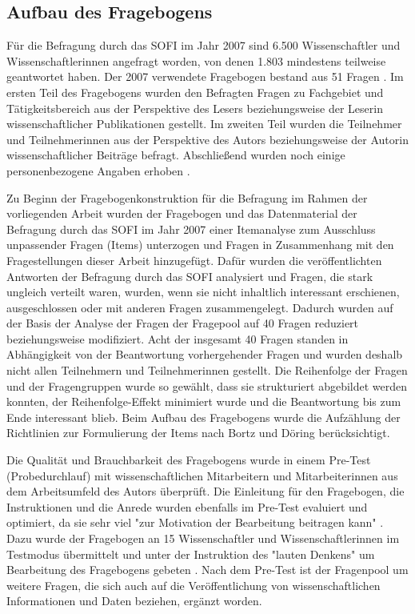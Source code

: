 \subsection{Aufbau des Fragebogens}

Für die Befragung durch das SOFI im Jahr 2007 sind 6.500 Wissenschaftler und Wissenschaftlerinnen angefragt worden, von denen 1.803 mindestens teilweise geantwortet haben. Der 2007 verwendete Fragebogen bestand aus 51 Fragen \cite{Hanekop_Wittke_2007_Fragebogen}. Im ersten Teil des Fragebogens wurden den Befragten Fragen zu Fachgebiet und Tätigkeitsbereich aus der Perspektive des Lesers beziehungsweise der Leserin wissenschaftlicher Publikationen gestellt. Im zweiten Teil wurden die Teilnehmer und Teilnehmerinnen aus der Perspektive des Autors beziehungsweise der Autorin wissenschaftlicher Beiträge befragt. Abschließend wurden noch einige personenbezogene Angaben erhoben \cite{Hanekop_Wittke_2007_Fragebogen}.

Zu Beginn der Fragebogenkonstruktion für die Befragung im Rahmen der vorliegenden Arbeit wurden der Fragebogen und das Datenmaterial der Befragung durch das SOFI im Jahr 2007 einer Itemanalyse zum Ausschluss unpassender Fragen (Items) unterzogen und Fragen in Zusammenhang mit den Fragestellungen dieser Arbeit hinzugefügt. Dafür wurden die veröffentlichten Antworten der Befragung durch das SOFI analysiert \cite{Hanekop_Wittke_2007_Fragebogen} und Fragen, die stark ungleich verteilt waren, wurden, wenn sie nicht inhaltlich interessant erschienen, ausgeschlossen oder mit anderen Fragen zusammengelegt. Dadurch wurden auf der Basis der Analyse der Fragen der Fragepool auf 40 Fragen reduziert beziehungsweise modifiziert. Acht der insgesamt 40 Fragen standen in Abhängigkeit von der Beantwortung vorhergehender Fragen und wurden deshalb nicht allen Teilnehmern und Teilnehmerinnen gestellt. Die Reihenfolge der Fragen und der Fragengruppen wurde so gewählt, dass sie strukturiert abgebildet werden konnten, der Reihenfolge-Effekt minimiert wurde und die Beantwortung bis zum Ende interessant blieb. Beim Aufbau des Fragebogens wurde die Aufzählung der Richtlinien zur Formulierung der Items nach Bortz und Döring \cite{raab_2012_fragebogen} berücksichtigt.

Die Qualität und Brauchbarkeit des Fragebogens wurde in einem Pre-Test (Probedurchlauf) mit wissenschaftlichen Mitarbeitern und Mitarbeiterinnen aus dem Arbeitsumfeld des Autors überprüft. Die Einleitung für den Fragebogen, die Instruktionen und die Anrede wurden ebenfalls im Pre-Test evaluiert und optimiert, da sie sehr viel "zur Motivation der Bearbeitung beitragen kann" \cite{raab_2012_fragebogen}. Dazu wurde der Fragebogen an 15 Wissenschaftler und Wissenschaftlerinnen im Testmodus übermittelt und unter der Instruktion des "lauten Denkens" um Bearbeitung des Fragebogens gebeten \cite{raab_2012_fragebogen}. Nach dem Pre-Test ist der Fragenpool um weitere Fragen, die sich auch auf die Veröffentlichung von wissenschaftlichen Informationen und Daten beziehen, ergänzt worden.

